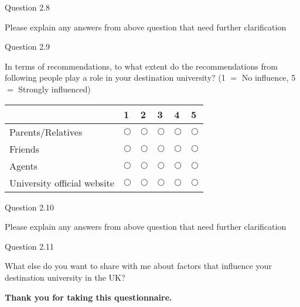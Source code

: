 Question 2.8 

Please explain any answers from above question that need further 
clarification

Question 2.9 

In terms of recommendations, to what extent do the recommendations from 
following people play a role in your destination university? (1 $=$ No 
influence, 5 $=$ Strongly influenced) 

\begin{table}[H]
\begin{center}
\begin{tabular}{|p{6cm}|p{1cm}|p{1cm}|p{1cm}|p{1cm}|p{1cm}|}
\hline
& 
1& 
2& 
3& 
4& 
5 \\
\hline
Parents/Relatives  & 
$\bigcirc $& 
$\bigcirc $& 
$\bigcirc $& 
$\bigcirc $& 
$\bigcirc $ \\
\hline
Friends  & 
$\bigcirc $& 
$\bigcirc $& 
$\bigcirc $& 
$\bigcirc $& 
$\bigcirc $ \\
\hline
Agents     & 
$\bigcirc $& 
$\bigcirc $& 
$\bigcirc $& 
$\bigcirc $& 
$\bigcirc $ \\
\hline
University official website & 
$\bigcirc $& 
$\bigcirc $& 
$\bigcirc $& 
$\bigcirc $& 
$\bigcirc $ \\
\hline

\end{tabular}
\label{tab1}
\end{center}
\end{table}



Question 2.10 

Please explain any answers from above question that need further 
clarification

Question 2.11 

What else do you want to share with me about factors that influence your 
destination university in the UK?

\begin{center}
\textbf{Thank you for taking this questionnaire.}
\end{center}





